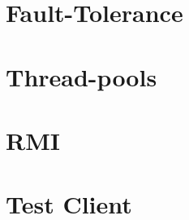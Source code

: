 \documentclass{report}
\begin{document}
	        \paragraph{}
	        
	        \paragraph{}

	\chapter{Fault-Tolerance}
	
	        \paragraph{}
	        
	        \paragraph{}

	\chapter{Thread-pools}
	
	        \paragraph{}
	        
	        \paragraph{}

	\chapter{RMI}
	
	        \paragraph{}
	        
	        \paragraph{}

	\chapter{Test Client}
	
\end{document}
